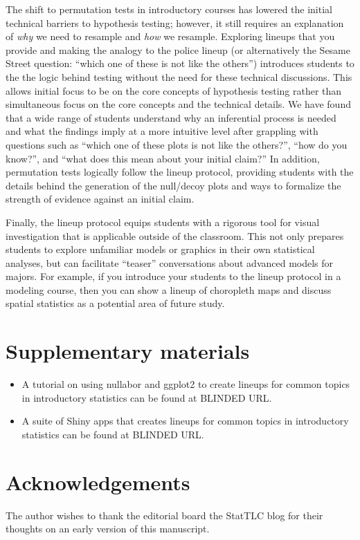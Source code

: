 \documentclass[12pt]{article}
\begin{document}
The shift to permutation tests in introductory courses has lowered the
initial technical barriers to hypothesis testing; however, it still
requires an explanation of \emph{why} we need to resample and \emph{how}
we resample. Exploring lineups that you provide and making the analogy
to the police lineup (or alternatively the Sesame Street question:
``which one of these is not like the others'') introduces students to
the the logic behind testing without the need for these technical
discussions. This allows initial focus to be on the core concepts of
hypothesis testing rather than simultaneous focus on the core concepts
and the technical details. We have found that a wide range of students
understand why an inferential process is needed and what the findings
imply at a more intuitive level after grappling with questions such as
``which one of these plots is not like the others?'', ``how do you
know?'', and ``what does this mean about your initial claim?'' In
addition, permutation tests logically follow the lineup protocol,
providing students with the details behind the generation of the
null/decoy plots and ways to formalize the strength of evidence against
an initial claim.

Finally, the lineup protocol equips students with a rigorous tool for
visual investigation that is applicable outside of the classroom. This
not only prepares students to explore unfamiliar models or graphics in
their own statistical analyses, but can facilitate ``teaser''
conversations about advanced models for majors. For example, if you
introduce your students to the lineup protocol in a modeling course,
then you can show a lineup of choropleth maps and discuss spatial
statistics as a potential area of future study.

\section*{Supplementary materials}

\begin{itemize}
\item
  A tutorial on using nullabor and ggplot2 to create lineups for common
  topics in introductory statistics can be found at BLINDED URL.
\item
  A suite of Shiny apps that creates lineups for common topics in
  introductory statistics can be found at BLINDED URL.
\end{itemize}

\section*{Acknowledgements}

The author wishes to thank the editorial board the StatTLC blog for
their thoughts on an early version of this manuscript.



\end{document}
